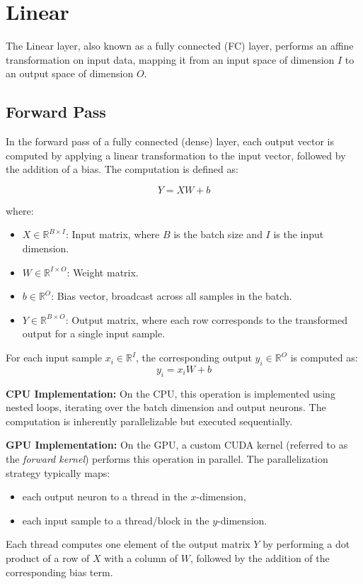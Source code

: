 \section{Linear}

The Linear layer, also known as a fully connected (FC) layer, performs an affine transformation on input data, mapping it from an input space of dimension $I$ to an output space of dimension $O$.

\subsection{Forward Pass}

In the forward pass of a fully connected (dense) layer, each output vector is computed by applying a linear transformation to the input vector, followed by the addition of a bias. The computation is defined as:

\[
    Y = XW + b
\]

where:
\begin{itemize}
    \item \( X \in \mathbb{R}^{B \times I} \): Input matrix, where \( B \) is the batch size and \( I \) is the input dimension.
    \item \( W \in \mathbb{R}^{I \times O} \): Weight matrix.
    \item \( b \in \mathbb{R}^{O} \): Bias vector, broadcast across all samples in the batch.
    \item \( Y \in \mathbb{R}^{B \times O} \): Output matrix, where each row corresponds to the transformed output for a single input sample.
\end{itemize}

For each input sample \( x_i \in \mathbb{R}^I \), the corresponding output \( y_i \in \mathbb{R}^O \) is computed as:
\[
    y_i = x_i W + b
\]

\textbf{CPU Implementation:}  
On the CPU, this operation is implemented using nested loops, iterating over the batch dimension and output neurons. The computation is inherently parallelizable but executed sequentially.

\textbf{GPU Implementation:}  
On the GPU, a custom CUDA kernel (referred to as the \textit{forward kernel}) performs this operation in parallel. The parallelization strategy typically maps:
\begin{itemize}
    \item each output neuron to a thread in the \( x \)-dimension,
    \item each input sample to a thread/block in the \( y \)-dimension.
\end{itemize}
Each thread computes one element of the output matrix \( Y \) by performing a dot product of a row of \( X \) with a column of \( W \), followed by the addition of the corresponding bias term.

